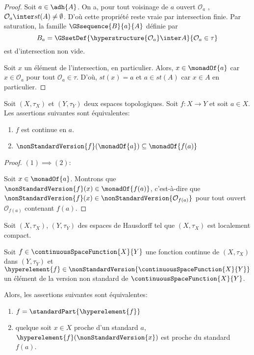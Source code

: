 \ifdefined\outputproof
\begin{proof}
	Soit $a \in \adh{A}$. On a, pour tout voisinage de $a$ ouvert
	$\mathcal{O}_{a}$ , $\mathcal{O}_{a} \inter st(A) \neq \emptyset$.
	D'où cette propriété reste vraie par intersection finie. Par saturation, la
	famille $\GSsequence{B}{a}{A}$ définie par
	\begin{equation}
		B_{a} = \GSsetDef{\hyperstructure{\mathcal{O}_{a}} \inter
	A}{\mathcal{O}_{a} \in \tau}
	\end{equation}
	est d'intersection non vide.

	Soit $x$ un élément de l'intersection, en particulier. Alors, $x \in \monadOf{a}$ car $x \in
	\mathcal{O}_{a}$ pour tout $\mathcal{O}_{a} \in \tau$. D'où, $st(x) = a$ et
	$a \in st(A)$ car $x \in A$ en particulier.
\end{proof}
\fi

\begin{proposition}
	Soit $(X, \tau_{X})$ et $(Y, \tau_{Y})$ deux espaces topologiques. Soit $f :
	X \rightarrow Y$ et soit $a \in X$.
	Les assertions suivantes sont équivalentes:
	\begin{enumerate}
		\item $f$ est continue en $a$.
		\item $\nonStandardVersion{f}(\monadOf{a}) \subseteq \monadOf{f(a)}$
	\end{enumerate}
\end{proposition}

\ifdefined\outputproof
\begin{proof}
	$(1) \implies (2)$:

	Soit $x \in \monadOf{a}$. Montrons que $\nonStandardVersion{f}(x) \in
	\monadOf{f(a)}$, c'est-à-dire que $\nonStandardVersion{f}(x) \in
	\nonStandardVersion{\mathcal{O}_{f(a)}}$ pour tout ouvert
	$\mathcal{O}_{f(a)}$ contenant $f(a)$.
\end{proof}
\fi

\begin{proposition}
	Soit $(X, \tau_{X})$, $(Y, \tau_{Y})$ des espaces de Hausdorff tel que $(X,
	\tau_{X})$ est localement compact.

	Soit $f \in \continuousSpaceFunction{X}{Y}$ une fonction continue de $(X,
	\tau_{X})$ dans $(Y, \tau_{Y})$ et $\hyperelement{f} \in
	\nonStandardVersion{\continuousSpaceFunction{X}{Y}}$ un élément de la
	version non standard de $\continuousSpaceFunction{X}{Y}$.

	Alors, les assertions suivantes sont équivalentes:
	\begin{enumerate}
		\item $f = \standardPart{\hyperelement{f}}$
		\item quelque soit $x \in X$ proche d'un standard $a$,
			$\hyperelement{f}(\nonStandardVersion{x})$ est proche du standard
			$f(a)$.
	\end{enumerate}
\end{proposition}

